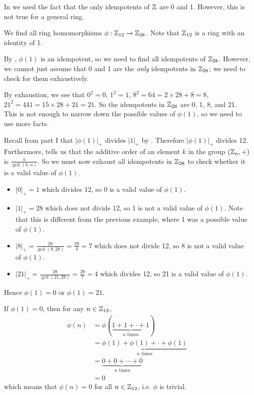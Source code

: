 In  we used the fact that the only idempotents of $\mathbb{Z}$ are 0 and 1. However, this is not true for a general ring.

\begin{example}\label{example-homomorphisms-from-Z12-to-Z28}
    We find all ring homomorphisms $\phi: \mathbb{Z}_{12} \to \mathbb{Z}_{28}$. Note that $\mathbb{Z}_{12}$ is a ring with an identity of 1.

    By , $\phi(1)$ is an idempotent, so we need to find all idempotents of $\mathbb{Z}_{28}$. However, we cannot just assume that 0 and 1 are the \textit{only} idempotents in $\mathbb{Z}_{28}$; we need to check for them exhaustively.

    By exhaustion, we see that $0^2 = 0$, $1^2 = 1$, $8^2 = 64 = 2 \times 28 + 8 = 8$, $21^2 = 441 = 15 \times 28 + 21 = 21$. So the idempotents in $\mathbb{Z}_{28}$ are 0, 1, 8, and 21. This is not enough to narrow down the possible values of $\phi(1)$, so we need to use more facts.

    Recall from part I that $|\phi(1)|_+$ divides $|1|_+$ by . Therefore $|\phi(1)|_+$ divides 12. Furthermore,  tells us that the additive order of an element $k$ in the group $(\mathbb{Z}_n, +)$ is $\frac{n}{\gcd(k,n)}$. So we must now exhaust all idempotents in $\mathbb{Z}_{28}$ to check whether it is a valid value of $\phi(1)$.
    \begin{itemize}
        \item $|0|_+ = 1$ which divides 12, so 0 is a valid value of $\phi(1)$.
        \item $|1|_+ = 28$ which does not divide 12, so 1 is not a valid value of $\phi(1)$. Note that this is different from the previous example, where 1 was a possible value of $\phi(1)$.
        \item $|8|_+ = \frac{28}{\gcd(8,28)} = \frac{28}4 = 7$ which does not divide 12, so 8 is not a valid value of $\phi(1)$.
        \item $|21|_+ = \frac{28}{\gcd(21,28)} = \frac{28}7 = 4$ which divides 12, so 21 is a valid value of $\phi(1)$.
    \end{itemize}
    Hence $\phi(1) = 0$ or $\phi(1) = 21$.

    If $\phi(1) = 0$, then for any $n \in \mathbb{Z}_{12}$,
    \begin{align*}
        \phi(n) &= \phi(\underbrace{1 + 1 + \cdot + 1}_{n \text{ times}})\\
        &= \underbrace{\phi(1) + \phi(1) + \cdot + \phi(1)}_{n \text{ times}}\\
        &= \underbrace{0 + 0 + \cdots + 0}_{n \text{ times}}\\
        &= 0
    \end{align*}
    which means that $\phi(n) = 0$ for all $n \in \mathbb{Z}_{12}$, i.e. $\phi$ is trivial.


\end{example}
